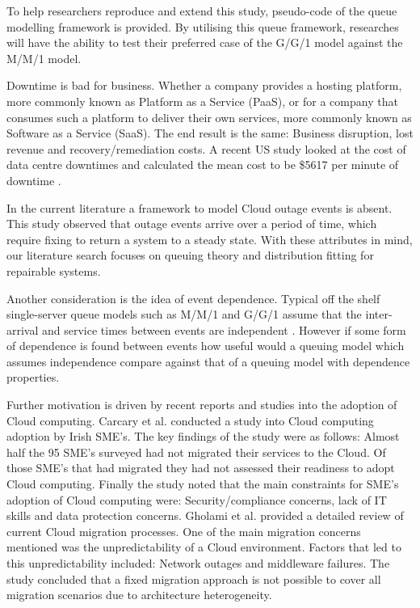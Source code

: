 \documentclass[5p]{elsarticle}
\begin{document}
To help researchers reproduce and extend this study, pseudo-code of the queue modelling framework is provided. By utilising this queue framework, researches will have the ability to test their preferred case of the G/G/1 model against the M/M/1 model.

Downtime is bad for business. Whether a company provides a hosting platform, more commonly known as Platform as a Service (PaaS), or for a company that consumes such a platform to deliver their own services, more commonly known as Software as a Service (SaaS). The end result is the same: Business disruption, lost revenue and recovery/remediation costs. A recent US study  looked at the cost of data centre downtimes and calculated the mean cost to be \$5617 per minute of downtime \cite{DCcost}.

In the current literature a framework to model Cloud outage events is absent. This study observed that outage events arrive over a period of time, which require fixing to return a system to a steady state. With these attributes in mind, our literature search focuses on queuing theory and distribution fitting for repairable systems.

Another consideration is the idea of event dependence. Typical off the shelf single-server queue models such as M/M/1 and G/G/1 assume that the inter-arrival and service times between events are independent \cite{MM1}. However if some form of dependence is found between events how useful would a queuing model which assumes independence compare against that of a queuing model with dependence properties.

Further motivation is driven by recent reports and studies into the adoption of Cloud computing.  Carcary et al. \cite{carcary2014adoption} conducted a study into Cloud computing adoption by Irish SME's. The key findings of the study were as follows: Almost half the 95 SME's surveyed had not migrated their services to the Cloud. Of those SME's that had migrated they had not assessed their readiness to adopt Cloud computing. Finally the study noted that the main constraints for SME's adoption of Cloud computing were: Security/compliance concerns, lack of IT skills and data protection concerns. Gholami et al. \cite{gholami2016Cloud} provided a detailed review of current Cloud migration processes. One of the main migration concerns mentioned was the unpredictability of a Cloud environment. Factors that led to this unpredictability included: Network outages and middleware failures. The study concluded that a fixed migration approach is not possible to cover all migration scenarios due to architecture heterogeneity.
\end{document}

